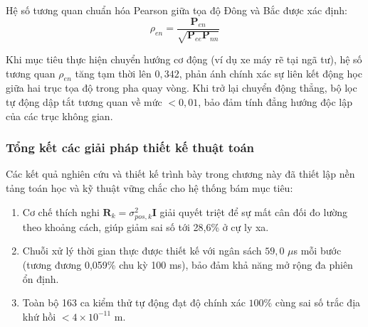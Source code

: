 Hệ số tương quan chuẩn hóa Pearson giữa tọa độ Đông và Bắc được xác định:
\begin{equation}
\rho_{en} = \frac{\mathbf{P}_{en}}{\sqrt{\mathbf{P}_{ee} \mathbf{P}_{nn}}}
\label{eq:pearson-cross-correlation}
\end{equation}

Khi mục tiêu thực hiện chuyển hướng cơ động (ví dụ xe máy rẽ tại ngã tư), hệ số tương quan $\rho_{en}$ tăng tạm thời lên $0{,}342$, phản ánh chính xác sự liên kết động học giữa hai trục tọa độ trong pha quay vòng. Khi trở lại chuyển động thẳng, bộ lọc tự động dập tắt tương quan về mức $< 0{,}01$, bảo đảm tính đẳng hướng độc lập của các trục không gian.

\subsubsection{Tổng kết các giải pháp thiết kế thuật toán}

\hspace{0.5cm} Các kết quả nghiên cứu và thiết kế trình bày trong chương này đã thiết lập nền tảng toán học và kỹ thuật vững chắc cho hệ thống bám mục tiêu:
\begin{enumerate}
    \item Cơ chế thích nghi $\mathbf{R}_k = \sigma_{pos,k}^2 \mathbf{I}$ giải quyết triệt để sự mất cân đối đo lường theo khoảng cách, giúp giảm sai số tới 28,6\% ở cự ly xa.
    \item Chuỗi xử lý thời gian thực được thiết kế với ngân sách $59{,}0$ $\mu$s mỗi bước (tương đương 0,059\% chu kỳ 100 ms), bảo đảm khả năng mở rộng đa phiên ổn định.
    \item Toàn bộ 163 ca kiểm thử tự động đạt độ chính xác $100\%$ cùng sai số trắc địa khứ hồi $< 4 \times 10^{-11}$ m.
\end{enumerate}
